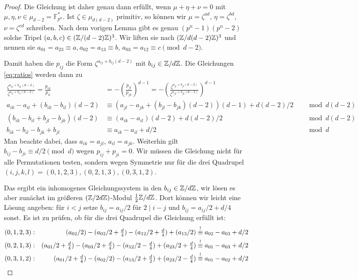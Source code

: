 \begin{proof}
Die Gleichung ist daher genau dann erfüllt, wenn $\mu+\eta+\nu = 0$ mit $\mu, \eta, \nu \in \mu_{d-2} = \mathbb F_{p^n}^*$. Ist $\zeta \in \mu_{d(d-2)}$ primitiv, so können wir $\mu = \zeta^{ad}$, $\eta = \zeta^{bd}$, $\nu = \zeta^{cd}$ schreiben. Nach dem vorigen Lemma gibt es genau $(p^n-1)(p^n-2)$ solche Tripel $(a,b,c) \in (\Zmod (d-2)Z)^3$. Wir liften sie nach $(\Zmod d(d-2)Z)^3$ und nennen sie $a_{01} = a_{23} \equiv a, a_{02} = a_{13} \equiv b$, $a_{03} = a_{12} \equiv c \pmod{d-2}$.

Damit haben die $p_{ij}$ die Form $\zeta^{a_{ij} + b_{ij}(d-2)}$ mit $b_{ij} \in \Zmod dZ$. Die Gleichungen \eqref{eq:ratios} werden dann zu
\begin{align*}
\frac{\zeta^{a_{ik} + b_{ik}(d-2)}}{\zeta^{a_{il} + b_{il}(d-2)}} = \frac{p_{ik}}{p_{il}} &= -\left(\frac{p_{jl}}{p_{jk}}\right)^{d-1} = -\left(\frac{\zeta^{a_{jl} + b_{jl}(d-2)}}{\zeta^{a_{jk} + b_{jk}(d-2)}}\right)^{d-1} \\
a_{ik} - a_{il} + (b_{ik} - b_{il})(d-2) &\equiv (a_{jl} - a_{jk} + (b_{jl} - b_{jk})(d-2))(d-1) + d(d-2)/2 &&\mod{d(d-2)} \\
(b_{ik} - b_{il} + b_{jl} - b_{jk})(d-2) &\equiv (a_{ik} - a_{il})(d-2) + d(d-2)/2 &&\mod{d(d-2)} \\
b_{ik} - b_{il} - b_{jk} + b_{jl} &\equiv a_{ik} - a_{il} + d/2 &&\mod d
\end{align*}
Man beachte dabei, dass $a_{ik} = a_{jl}$, $a_{il} = a_{jk}$. Weiterhin gilt $b_{ij} - b_{ji} \equiv d/2 \pmod d$ wegen $p_{ij} + p_{ji} = 0$. Wir müssen die Gleichung nicht für alle Permutationen testen, sondern wegen Symmetrie nur für die drei Quadrupel $(i,j,k,l) = (0,1,2,3), (0,2,1,3), (0,3,1,2)$.

Das ergibt ein inhomogenes Gleichungssystem in den $b_{ij} \in \Zmod dZ$, wir lösen es aber zunächst im größeren $(\Zmod 2dZ)$-Modul $\frac 12 \Zmod dZ$. Dort können wir leicht eine Lösung angeben: für $i<j$ setze $b_{ij} = a_{ij}/2$ für $2 \mid i-j$ und $b_{ij} = a_{ij}/2 + d/4$ sonst. Es ist zu prüfen, ob für die drei Quadrupel die Gleichung erfüllt ist:
\begin{align*}
&(0,1,2,3): &(a_{02}/2) - (a_{03}/2+\tfrac d4) - (a_{12}/2+\tfrac d4) + (a_{13}/2) &\overrel{\equiv}^! a_{02} - a_{03} + d/2 \\
&(0,2,1,3): &(a_{01}/2+\tfrac d4) - (a_{03}/2+\tfrac d4) - (a_{12}/2-\tfrac d4) + (a_{23}/2+\tfrac d4) &\overrel{\equiv}^! a_{01} - a_{03} + d/2 \\
&(0,3,1,2): &(a_{01}/2+\tfrac d4) - (a_{02}/2) - (a_{13}/2+\tfrac d2) + (a_{23}/2-\tfrac d4) &\overrel{\equiv}^! a_{01} - a_{02} + d/2
\end{align*}


\end{proof}

